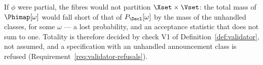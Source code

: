 
\begin{remark}\label{rem:phitotal}
If $\phi$ were partial, the fibres would not partition $\Xset\times\Vset$: the
total mass of $\Phimap[\omega]$ would fall short of that of
$P_{\Decl}[\omega]$ by the mass of the unhandled classes, for some $\omega$ ---
a lost probability, and an acceptance statistic that does not sum to one.
Totality is therefore decided by check V1 of Definition~\ref{def:validator},
not assumed, and a specification with an unhandled announcement class is
refused (Requirement~\ref{req:validator-refusals}).
\end{remark}
